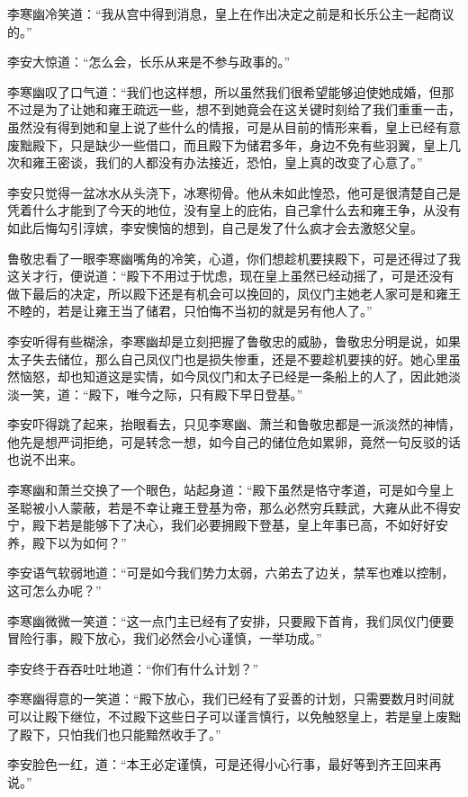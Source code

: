 李寒幽冷笑道：“我从宫中得到消息，皇上在作出决定之前是和长乐公主一起商议的。”

李安大惊道：“怎么会，长乐从来是不参与政事的。”

李寒幽叹了口气道：“我们也这样想，所以虽然我们很希望能够迫使她成婚，但那不过是为了让她和雍王疏远一些，想不到她竟会在这关键时刻给了我们重重一击，虽然没有得到她和皇上说了些什么的情报，可是从目前的情形来看，皇上已经有意废黜殿下，只是缺少一些借口，而且殿下为储君多年，身边不免有些羽翼，皇上几次和雍王密谈，我们的人都没有办法接近，恐怕，皇上真的改变了心意了。”

李安只觉得一盆冰水从头浇下，冰寒彻骨。他从未如此惶恐，他可是很清楚自己是凭着什么才能到了今天的地位，没有皇上的庇佑，自己拿什么去和雍王争，从没有如此后悔勾引淳嫔，李安懊恼的想到，自己是发了什么疯才会去激怒父皇。

鲁敬忠看了一眼李寒幽嘴角的冷笑，心道，你们想趁机要挟殿下，可是还得过了我这关才行，便说道：“殿下不用过于忧虑，现在皇上虽然已经动摇了，可是还没有做下最后的决定，所以殿下还是有机会可以挽回的，凤仪门主她老人家可是和雍王不睦的，若是让雍王当了储君，只怕悔不当初的就是另有他人了。”

李安听得有些糊涂，李寒幽却是立刻把握了鲁敬忠的威胁，鲁敬忠分明是说，如果太子失去储位，那么自己凤仪门也是损失惨重，还是不要趁机要挟的好。她心里虽然恼怒，却也知道这是实情，如今凤仪门和太子已经是一条船上的人了，因此她淡淡一笑，道：“殿下，唯今之际，只有殿下早日登基。”

李安吓得跳了起来，抬眼看去，只见李寒幽、萧兰和鲁敬忠都是一派淡然的神情，他先是想严词拒绝，可是转念一想，如今自己的储位危如累卵，竟然一句反驳的话也说不出来。

李寒幽和萧兰交换了一个眼色，站起身道：“殿下虽然是恪守孝道，可是如今皇上圣聪被小人蒙蔽，若是不幸让雍王登基为帝，那么必然穷兵黩武，大雍从此不得安宁，殿下若是能够下了决心，我们必要拥殿下登基，皇上年事已高，不如好好安养，殿下以为如何？”

李安语气软弱地道：“可是如今我们势力太弱，六弟去了边关，禁军也难以控制，这可怎么办呢？”

李寒幽微微一笑道：“这一点门主已经有了安排，只要殿下首肯，我们凤仪门便要冒险行事，殿下放心，我们必然会小心谨慎，一举功成。”

李安终于吞吞吐吐地道：“你们有什么计划？”

李寒幽得意的一笑道：“殿下放心，我们已经有了妥善的计划，只需要数月时间就可以让殿下继位，不过殿下这些日子可以谨言慎行，以免触怒皇上，若是皇上废黜了殿下，只怕我们也只能黯然收手了。”

李安脸色一红，道：“本王必定谨慎，可是还得小心行事，最好等到齐王回来再说。”

